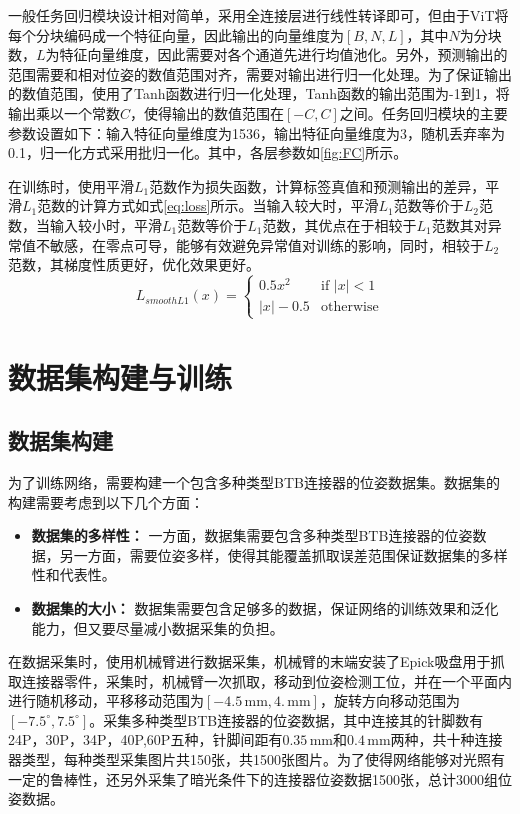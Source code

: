 \documentclass{Diploma}
\begin{document}
%

一般任务回归模块设计相对简单，采用全连接层进行线性转译即可，但由于ViT将每个分块编码成一个特征向量，因此输出的向量维度为$[B,N,L]$，其中$N$为分块数，$L$为特征向量维度，因此需要对各个通道先进行均值池化。另外，预测输出的范围需要和相对位姿的数值范围对齐，需要对输出进行归一化处理。为了保证输出的数值范围，使用了Tanh函数进行归一化处理，Tanh函数的输出范围为-1到1，将输出乘以一个常数$C$，使得输出的数值范围在$[-C,C]$之间。任务回归模块的主要参数设置如下：输入特征向量维度为1536，输出特征向量维度为3，随机丢弃率为0.1，归一化方式采用批归一化。其中，各层参数如\ref{fig:FC}所示。

在训练时，使用平滑$L_{1}$范数作为损失函数，计算标签真值和预测输出的差异，平滑$L_{1}$范数的计算方式如式\eqref{eq:loss}所示。当输入较大时，平滑$L_{1}$范数等价于$L_2$范数，当输入较小时，平滑$L_{1}$范数等价于$L_{1}$范数，其优点在于相较于$L_1$范数其对异常值不敏感，在零点可导，能够有效避免异常值对训练的影响，同时，相较于$L_2$范数，其梯度性质更好，优化效果更好。
\begin{equation} \label{eq:loss}
  L_{smoothL1}(x) = \begin{cases}
    0.5x^2 & \text{if } |x| < 1 \\
    |x| - 0.5 & \text{otherwise}
  \end{cases}
\end{equation}

\section{数据集构建与训练}
\subsection{数据集构建}
为了训练网络，需要构建一个包含多种类型BTB连接器的位姿数据集。数据集的构建需要考虑到以下几个方面：
\begin{itemize}
  \item \textbf{数据集的多样性：} 一方面，数据集需要包含多种类型BTB连接器的位姿数据，另一方面，需要位姿多样，使得其能覆盖抓取误差范围保证数据集的多样性和代表性。
  \item \textbf{数据集的大小：} 数据集需要包含足够多的数据，保证网络的训练效果和泛化能力，但又要尽量减小数据采集的负担。
\end{itemize}

在数据采集时，使用机械臂进行数据采集，机械臂的末端安装了Epick吸盘用于抓取连接器零件，采集时，机械臂一次抓取，移动到位姿检测工位，并在一个平面内进行随机移动，平移移动范围为$[-4.5\,\mathrm{mm},4.\,\mathrm{mm}]$，旋转方向移动范围为$[-7.5^{\circ},7.5^{\circ}]$。采集多种类型BTB连接器的位姿数据，其中连接其的针脚数有24P，30P，34P，40P,60P五种，针脚间距有$0.35\,\mathrm{mm}$和$0.4\,\mathrm{mm}$两种，共十种连接器类型，每种类型采集图片共150张，共1500张图片。为了使得网络能够对光照有一定的鲁棒性，还另外采集了暗光条件下的连接器位姿数据1500张，总计3000组位姿数据。
\end{document}
